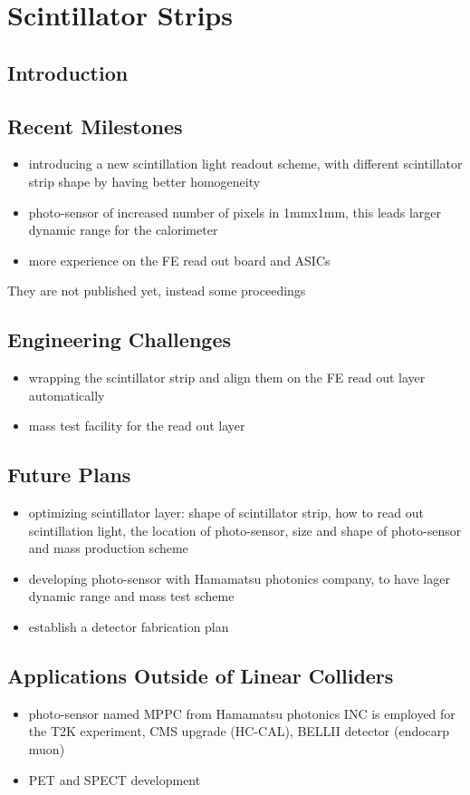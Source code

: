 \section{Scintillator Strips}
\subsection{Introduction}
\subsection{Recent Milestones}
\begin{itemize}
	\item introducing a new scintillation light readout scheme, with different scintillator strip shape  by having better homogeneity
	\item photo-sensor of increased number of pixels in 1mmx1mm, this leads larger dynamic range for the calorimeter
	\item more experience on the FE read out board and ASICs
\end{itemize}
They are not published yet, instead some proceedings

\subsection{Engineering Challenges}
\begin{itemize}
	\item wrapping the scintillator strip and align them on the FE read out layer automatically
	\item mass test facility for the read out layer
\end{itemize}

\subsection{Future Plans}
\begin{itemize}
	\item optimizing scintillator layer: shape of scintillator strip, how to read out scintillation light, the location of  photo-sensor, size and shape of photo-sensor and mass production scheme
	\item developing photo-sensor with Hamamatsu photonics company, to have lager dynamic range and mass test scheme
	\item establish a detector fabrication plan
\end{itemize}

\subsection{Applications Outside of Linear Colliders}
\begin{itemize}
	\item photo-sensor named MPPC from Hamamatsu photonics INC is employed for the T2K experiment, CMS upgrade (HC-CAL), BELLII detector (endocarp muon)
	\item PET and SPECT development
\end{itemize}
